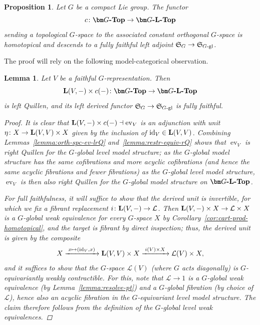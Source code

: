 \documentclass[reqno]{memo-l}
\theoremstyle{mythm}
\newtheorem{lemma}[thm]{Lemma}
\newtheorem{prop}[thm]{Proposition}
\theoremstyle{definition}
\numberwithin{equation}{section}
\DeclareMathOperator{\ev}{ev}
\newcommand{\cat}[1]{\textbf{\textup{#1}}}
\newcommand{\consto}{\ensuremath{c}}
\newcommand{\id}{\textup{id}}
\newcommand{\myS}{{{\mathfrak S\kern-.4pt}}}
\begin{document}
\begin{prop}\label{prop:triv-ff}
    Let $G$ be a compact Lie group. The functor
    \[
        \consto\colon\cat{$\bm G$-Top}\to\cat{$\bm G$-$\cat{L}$-Top}
    \] sending a topological $G$-space to the associated constant orthogonal $G$-space 
    is homotopical and descends to a fully faithful left adjoint $\myS_G\to\myS_\textup{$G$-gl}$.
\end{prop}

The proof will rely on the following model-categorical observation.

\begin{lemma}
    Let $V$ be a faithful $G$-representation. Then
    \begin{equation}\label{eq:const-made-left-Quillen}
        \cat{L}(V,-)\times\consto(-)\colon \cat{$\bm G$-Top}\to\cat{$\bm G$-${\cat L}$-Top}
    \end{equation}
    is left Quillen, and its left derived functor $\myS_G\to\myS_\textup{$G$-gl}$ is fully faithful.
    \begin{proof}
        It is clear that $\cat{L}(V,-)\times\consto(-)\dashv\ev_V$ is an adjunction with unit $\eta\colon X\to\cat{L}(V,V)\times X$ given by the inclusion of $\id_V\in\cat{L}(V,V)$. Combining Lemmas~\ref{lemma:orth-spc-ev-lrQ} and~\ref{lemma:restr-equiv-rQ} shows that $\ev_V$ is right Quillen for the $G$-global \emph{level} model structure; as the $G$-global model structure has the same cofibrations and more acyclic cofibrations (and hence the same acyclic fibrations and fewer fibrations) as the $G$-global level model structure, $\ev_V$ is then also right Quillen for the $G$-global model structure on $\cat{$\bm G$-$\cat{L}$-Top}$.
        
        For full faithfulness, it will suffice to show that the derived unit is invertible, for which we fix a fibrant replacement $i\colon\cat{L}(V,-)\to\mathcal L$. Then $\cat{L}(V,-)\times X\to\mathcal L\times X$ is a $G$-global weak equivalence for every $G$-space $X$ by Corollary~\ref{cor:cart-prod-homotopical}, and the target is fibrant by direct inspection; thus, the derived unit is given by the composite
        \[
            X\xrightarrow{\;x\mapsto(\id_V,x)\;}\cat{L}(V,V)\times X\xrightarrow{\;i(V)\times X\;}\mathcal L(V)\times X,
        \]
        and it suffices to show that the $G$-space $\mathcal L(V)$ (where $G$ acts diagonally) is $G$-equivariantly weakly contractible. For this, note that $\mathcal L\to 1$ is a $G$-global weak equivalence (by Lemma~\ref{lemma:resolve-pt}) and a $G$-global fibration (by choice of $\mathcal L$), hence also an acyclic fibration in the $G$-equivariant \emph{level} model structure. The claim therefore follows from the definition of the $G$-global level weak equivalences.
    \end{proof}
\end{lemma}
\end{document}
